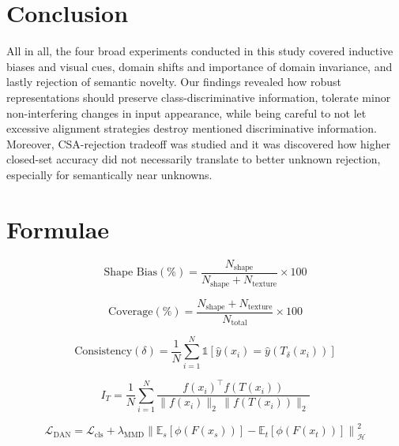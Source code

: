 \documentclass{article}
\begin{document}
\section{Conclusion}
\label{sec:conclusion}
All in all, the four broad experiments conducted in this study covered inductive biases and visual cues, domain shifts and importance of domain invariance, and lastly rejection of semantic novelty. Our findings revealed how robust representations should preserve class-discriminative information, tolerate minor non-interfering changes in input appearance, while being careful to not let excessive alignment strategies destroy mentioned discriminative information. Moreover, CSA-rejection tradeoff was studied and it was discovered how higher closed-set accuracy did not necessarily translate to better unknown rejection, especially for semantically near unknowns.





\appendix
\section{Formulae}
\label{app:formulae}

\begin{equation}
\text{Shape Bias}(\%) = \frac{N_{\text{shape}}}{N_{\text{shape}} + N_{\text{texture}}} \times 100
\label{eq:shape_bias}
\end{equation}

\begin{equation}
\text{Coverage}(\%) = \frac{N_{\text{shape}} + N_{\text{texture}}}{N_{\text{total}}} \times 100
\label{eq:coverage}
\end{equation}

\begin{equation}
\text{Consistency}(\delta) = \frac{1}{N} \sum_{i=1}^{N} \mathbb{1}\left[\hat{y}(x_i) = \hat{y}(T_\delta(x_i))\right]
\label{eq:consistency}
\end{equation}

\begin{equation}
I_T = \frac{1}{N} \sum_{i=1}^{N} \frac{f(x_i)^\top f(T(x_i))}{\lVert f(x_i) \rVert_2 \, \lVert f(T(x_i)) \rVert_2}
\label{eq:cosine_stability}
\end{equation}

\begin{equation}
\mathcal{L}_{\text{DAN}} = \mathcal{L}_{\text{cls}} + \lambda_{\text{MMD}} \left\lVert \mathbb{E}_s[\phi(F(x_s))] - \mathbb{E}_t[\phi(F(x_t))] \right\rVert^2_{\mathcal{H}}
\label{eq:mmd}
\end{equation}
\end{document}
